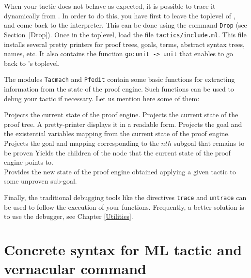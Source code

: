 When your tactic does not behave as expected, it is possible to trace
it dynamically from \Coq. In order to do this, you have first to leave
the toplevel of \Coq, and come back to the \ocaml{} interpreter. This can
be done using the command \texttt{Drop} (see Section~\ref{Drop}). Once
in the \ocaml{} toplevel, load the file \texttt{tactics/include.ml}.
This file installs several pretty printers for proof trees, goals,
terms, abstract syntax trees, names, etc.  It also contains the
function \texttt{go:unit -> unit} that enables to go back to \Coq's
toplevel. 

The modules \texttt{Tacmach} and \texttt{Pfedit} contain some basic
functions for extracting information from the state of the proof
engine. Such functions can be used to debug your tactic if
necessary. Let us mention here some of them:

\begin{description}
    {Projects the current state of the proof engine.}
    {Projects the current state of the proof tree. A pretty-printer 
      displays it in a readable form.  }
    {Projects the goal and the existential variables mapping from
     the current state of the proof engine.} 
    {Projects the goal and mapping corresponding to the $nth$ subgoal
     that remains to be proven}
    {Yields the children of the node that the current state of the 
     proof engine points to.}
     {\\ Provides the new state of the proof engine obtained applying 
      a given tactic to some unproven sub-goal.}
\end{description}

Finally, the traditional \ocaml{} debugging tools like the directives
\texttt{trace} and \texttt{untrace} can be used to follow the
execution of your functions. Frequently, a better solution is to use
the \ocaml{} debugger, see Chapter \ref{Utilities}.

\section[Concrete syntax for ML tactic and vernacular command]{Concrete syntax for ML tactic and vernacular command\label{Notations-for-ML-command}}

